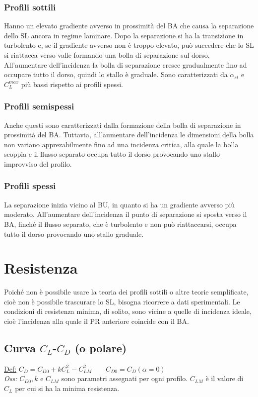 \documentclass[11pt,a4paper]{report}
\begin{document}
			\subsubsection{Profili sottili}
			Hanno un elevato gradiente avverso in prossimità del BA che causa la separazione dello SL ancora in regime laminare. Dopo la separazione si ha la transizione in turbolento e, se il gradiente avverso non è troppo elevato, può succedere che lo SL si riattacca verso valle formando una bolla di separazione sul dorso. All'aumentare dell'incidenza la bolla di separazione cresce gradualmente fino ad occupare tutto il dorso, quindi lo stallo è graduale. Sono caratterizzati da $\alpha_{st}$ e $C_L^{max}$ più bassi rispetto ai profili spessi.
			\subsubsection{Profili semispessi}
			Anche questi sono caratterizzati dalla formazione della bolla di separazione in prossimità del BA. Tuttavia, all'aumentare dell'incidenza le dimensioni della bolla non variano apprezabilmente fino ad una incidenza critica, alla quale la bolla scoppia e il flusso separato occupa tutto il dorso provocando uno stallo improvviso del profilo.
			\subsubsection{Profili spessi}
			La separazione inizia vicino al BU, in quanto si ha un gradiente avverso più moderato. All'aumentare dell'incidenza il punto di separazione si sposta verso il BA, finché il flusso separato, che è turbolento e non può riattaccarsi, occupa tutto il dorso provocando uno stallo graduale.
		
	\section{Resistenza}
	Poiché non è possibile usare la teoria dei profili sottili o altre teorie semplificate, cioè non è possibile trascurare lo SL, bisogna ricorrere a dati sperimentali. Le condizioni di resistenza minima, di solito, sono vicine a quelle di incidenza ideale, cioè l'incidenza alla quale il PR anteriore coincide con il BA.
		\subsection{Curva $C_L$-$C_D$ (o polare)}
		\underline{Def:} $C_D=C_{D0}+kC_L^2-C_{LM}^2\qquad C_{D0}=C_D(\alpha\!=\!0)$\\
		\textit{Oss:} $C_{D0}, k$ e $C_{LM}$ sono parametri assegnati per ogni profilo. $C_{LM}$ è il valore di $C_L$ per cui si ha la minima resistenza.
\end{document}
